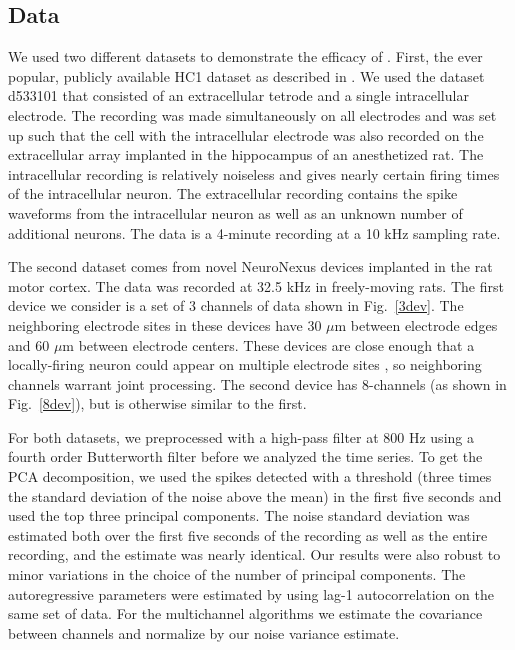
\subsection{Data}

We used two different datasets to demonstrate the efficacy of \smug.  First, the ever popular, publicly available HC1 dataset %
as described in \cite{Henze2000}.  We used the dataset d533101 that consisted of an extracellular tetrode and a single intracellular electrode.  The recording was made simultaneously on all electrodes and was set up such that the cell with the intracellular electrode was also recorded on the extracellular array implanted in the hippocampus of an anesthetized rat. The intracellular recording is relatively noiseless and gives nearly certain firing times of the intracellular neuron.  The extracellular recording contains the spike waveforms from the intracellular neuron as well as an unknown number of additional neurons.  The data is a 4-minute recording at a 10 kHz sampling rate.  

The second dataset comes from novel NeuroNexus devices implanted in the rat motor cortex.  The data was recorded at 32.5 kHz in freely-moving rats.  The first device we consider is a set of 3 channels of data shown in Fig.\ \ref{3dev}.  The neighboring electrode sites in these devices have 30 $\mu$m between electrode edges and 60 $\mu$m between electrode centers.  These devices are close enough that a locally-firing neuron could appear on multiple electrode sites , so neighboring channels warrant joint processing.  The second device has 8-channels (as shown in Fig.\ \ref{8dev}), but is otherwise similar to the first.



For both datasets, we preprocessed with a high-pass filter at 800 Hz using a fourth order Butterworth filter before we analyzed the time series.  To get the PCA decomposition, we used the spikes detected with a threshold (three times the standard deviation of the noise above the mean) in the first five seconds and used the top three principal components.  The noise standard deviation was estimated both over the first five seconds of the recording as well as the entire recording, and the estimate was nearly identical.  Our results were also robust to minor variations in the choice of the number of principal components.  The autoregressive parameters were estimated by using lag-1 autocorrelation on the same set of data.  For the multichannel algorithms we estimate the covariance between channels and normalize by our noise variance estimate.

